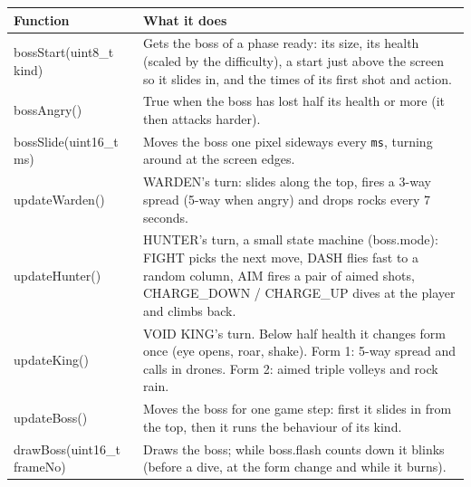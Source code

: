 \documentclass[11pt,a4paper]{article}
\begin{document}
\par\noindent\begin{minipage}{\linewidth}\centering\footnotesize
\begin{tabular}{|>{\raggedright\arraybackslash}p{5.82cm}|>{\raggedright\arraybackslash}p{10.68cm}|}
\hline\rowcolor{accent}\textbf{\color{white}Function} & \textbf{\color{white}What it does}\\\hline
bossStart(uint8\_t kind) & Gets the boss of a phase ready: its size, its health (scaled by the difficulty), a start just above the screen so it slides in, and the times of its first shot and action.\\\hline
\rowcolor{rowshade}bossAngry() & True when the boss has lost half its health or more (it then attacks harder).\\\hline
bossSlide(uint16\_t ms) & Moves the boss one pixel sideways every \texttt{ms}, turning around at the screen edges.\\\hline
\rowcolor{rowshade}updateWarden() & WARDEN's turn: slides along the top, fires a 3-way spread (5-way when angry) and drops rocks every 7 seconds.\\\hline
updateHunter() & HUNTER's turn, a small state machine (boss.mode): FIGHT picks the next move, DASH flies fast to a random column, AIM fires a pair of aimed shots, CHARGE\_DOWN / CHARGE\_UP dives at the player and climbs back.\\\hline
\rowcolor{rowshade}updateKing() & VOID KING's turn. Below half health it changes form once (eye opens, roar, shake). Form 1: 5-way spread and calls in drones. Form 2: aimed triple volleys and rock rain.\\\hline
updateBoss() & Moves the boss for one game step: first it slides in from the top, then it runs the behaviour of its kind.\\\hline
\rowcolor{rowshade}drawBoss(uint16\_t frameNo) & Draws the boss; while boss.flash counts down it blinks (before a dive, at the form change and while it burns).\\\hline
\end{tabular}
\end{minipage}\par\medskip
\end{document}
